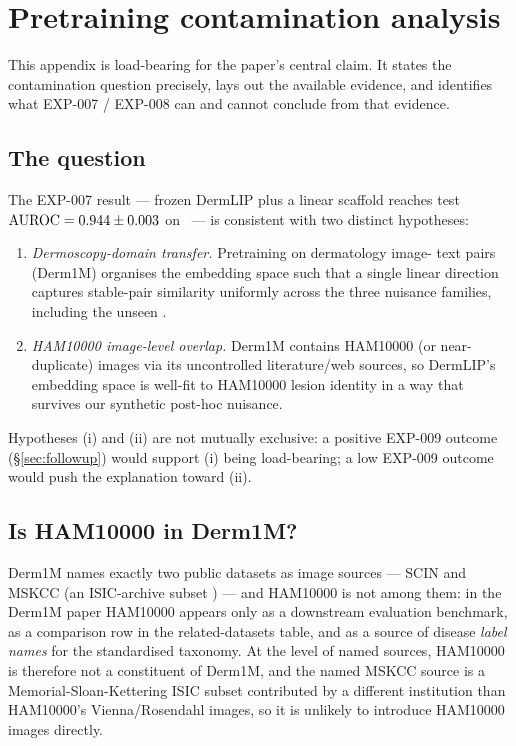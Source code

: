 \section{Pretraining contamination analysis}
\label{app:contamination}

This appendix is load-bearing for the paper's central claim. It states
the contamination question precisely, lays out the available evidence,
and identifies what EXP-007 / EXP-008 can and cannot conclude from that
evidence.

\subsection{The question}
The EXP-007 result --- frozen DermLIP plus a linear scaffold reaches
test $\mathrm{AUROC} = 0.944 \pm 0.003$ on \strongholdtwo\ --- is consistent with
two distinct hypotheses:
\begin{enumerate}[label=(\roman*), leftmargin=2em]
\item \emph{Dermoscopy-domain transfer.} Pretraining on dermatology image-
      text pairs (Derm1M) organises the embedding space such that a
      single linear direction captures stable-pair similarity uniformly
      across the three nuisance families, including the unseen
      \strongholdtwo.
\item \emph{HAM10000 image-level overlap.} Derm1M contains HAM10000 (or
      near-duplicate) images via its uncontrolled literature/web sources,
      so DermLIP's embedding space is well-fit to HAM10000 lesion identity
      in a way that survives our synthetic post-hoc nuisance.
\end{enumerate}
Hypotheses (i) and (ii) are not mutually exclusive: a positive
EXP-009 outcome (\S\ref{sec:followup}) would support (i) being load-bearing;
a low EXP-009 outcome would push the explanation toward (ii).

\subsection{Is HAM10000 in Derm1M?}
Derm1M \citep{yan2025derm1m} names exactly two public datasets as image
sources --- SCIN and MSKCC (an ISIC-archive subset \citep{codella2018isic})
--- and HAM10000 \citep{tschandl2018ham10000} is not among them: in the
Derm1M paper HAM10000 appears only as a downstream evaluation benchmark,
as a comparison row in the related-datasets table, and as a source of
disease \emph{label names} for the standardised taxonomy. At the level of
named sources, HAM10000 is therefore not a constituent of Derm1M, and the
named MSKCC source is a Memorial-Sloan-Kettering ISIC subset contributed by
a different institution than HAM10000's Vienna/Rosendahl images, so it is
unlikely to introduce HAM10000 images directly.

